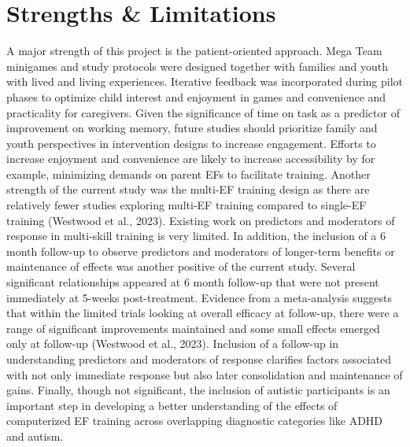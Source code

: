 \documentclass[
  letterpaper,
]{ut-thesis}
\begin{document}
\section{Strengths \& Limitations}\label{strengths-limitations}

A major strength of this project is the patient-oriented approach. Mega
Team minigames and study protocols were designed together with families
and youth with lived and living experiences. Iterative feedback was
incorporated during pilot phases to optimize child interest and
enjoyment in games and convenience and practicality for caregivers.
Given the significance of time on task as a predictor of improvement on
working memory, future studies should prioritize family and youth
perspectives in intervention designs to increase engagement. Efforts to
increase enjoyment and convenience are likely to increase accessibility
by for example, minimizing demands on parent EFs to facilitate training.
Another strength of the current study was the multi-EF training design
as there are relatively fewer studies exploring multi-EF training
compared to single-EF training (Westwood et al., 2023). Existing work on
predictors and moderators of response in multi-skill training is very
limited. In addition, the inclusion of a 6 month follow-up to observe
predictors and moderators of longer-term benefits or maintenance of
effects was another positive of the current study. Several significant
relationships appeared at 6 month follow-up that were not present
immediately at 5-weeks post-treatment. Evidence from a meta-analysis
suggests that within the limited trials looking at overall efficacy at
follow-up, there were a range of significant improvements maintained and
some small effects emerged only at follow-up (Westwood et al., 2023).
Inclusion of a follow-up in understanding predictors and moderators of
response clarifies factors associated with not only immediate response
but also later consolidation and maintenance of gains. Finally, though
not significant, the inclusion of autistic participants is an important
step in developing a better understanding of the effects of computerized
EF training across overlapping diagnostic categories like ADHD and
autism.
\end{document}
